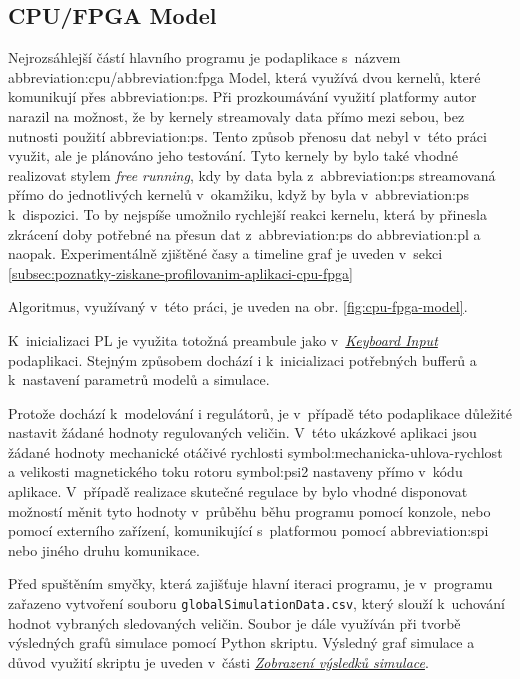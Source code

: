 \documentclass[a4paper, twoside, 11pt]{article}
\begin{document}
		\subsection{CPU/FPGA Model}\label{subsec:cpu-fpga}
			Nejrozsáhlejší částí hlavního programu je podaplikace s~názvem \gls{abbreviation:cpu}/\gls{abbreviation:fpga} Model, která využívá dvou kernelů, které komunikují přes \gls{abbreviation:ps}. Při prozkoumávání využití platformy autor narazil na možnost, že by kernely streamovaly data přímo mezi sebou, bez nutnosti použití \gls{abbreviation:ps}. Tento způsob přenosu dat nebyl v~této práci využit, ale je plánováno jeho testování. Tyto kernely by bylo také vhodné realizovat stylem \textit{free running}, kdy by data byla z~\gls{abbreviation:ps} streamovaná přímo do jednotlivých kernelů v~okamžiku, když by byla v~\gls{abbreviation:ps} k~dispozici. To by nejspíše umožnilo rychlejší reakci kernelu, která by přinesla zkrácení doby potřebné na přesun dat z~\gls{abbreviation:ps} do \gls{abbreviation:pl} a naopak. Experimentálně zjištěné časy a timeline graf je uveden v~sekci \ref{subsec:poznatky-ziskane-profilovanim-aplikaci-cpu-fpga}\par
			Algoritmus, využívaný v~této práci, je uveden na obr. \ref{fig:cpu-fpga-model}.\par
			K~inicializaci PL je využita totožná preambule jako v~\hyperref[subsec:keyboard-input]{\textit{Keyboard Input}} podaplikaci. Stejným způsobem dochází i k~inicializaci potřebných bufferů a k~nastavení parametrů modelů a simulace.\par
			Protože dochází k~modelování i regulátorů, je v~případě této podaplikace důležité nastavit žádané hodnoty regulovaných veličin. V~této ukázkové aplikaci jsou žádané hodnoty mechanické otáčivé rychlosti \gls{symbol:mechanicka-uhlova-rychlost} a velikosti magnetického toku rotoru \gls{symbol:psi2} nastaveny přímo v~kódu aplikace. V~případě realizace skutečné regulace by bylo vhodné disponovat možností měnit tyto hodnoty v~průběhu běhu programu pomocí konzole, nebo pomocí externího zařízení, komunikující s~platformou pomocí \gls{abbreviation:spi} nebo jiného druhu komunikace.\par
			Před spuštěním smyčky, která zajišťuje hlavní iteraci programu, je v~programu zařazeno vytvoření souboru \texttt{globalSimulationData.csv}, který slouží k~uchování hodnot vybraných sledovaných veličin. Soubor je dále využíván při tvorbě výsledných grafů simulace pomocí Python skriptu. Výsledný graf simulace a důvod využití skriptu je uveden v~části \hyperref[subsubsec:zobrazeni-vysledku-simulace]{\textit{Zobrazení výsledků simulace}}.\par
\end{document}
